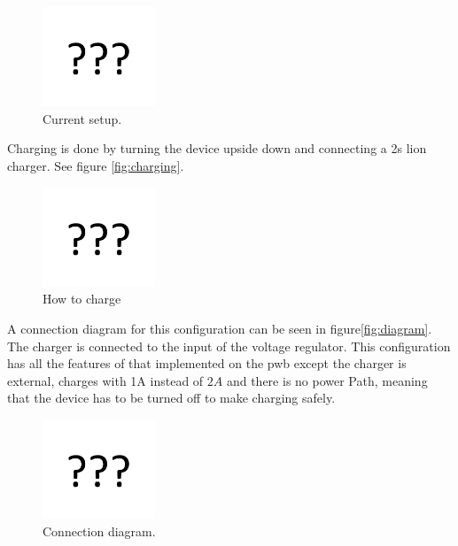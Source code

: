 \begin{figure}[H]
	\centering
	\includegraphics[width=0.3\textwidth]{Figures/missing.png} %
	\caption{Current setup.} %
	\label{fig:modules}
\end{figure}


Charging is done by turning the device upside down and connecting a \gls{2s} \gls{lion} charger. See figure \autoref{fig:charging}.

\begin{figure}[H]
	\centering
	\includegraphics[width=0.3\textwidth]{Figures/missing.png} %
	\caption{How to charge}
	\label{fig:charging}
\end{figure}

A connection diagram for this configuration can be seen in figure\autoref{fig:diagram}. The charger is connected to the input of the voltage regulator. This configuration has all the features of that implemented on the \gls{pwb} except the charger is external, charges with 1A instead of $2A$ and there is no power Path, meaning that the device has to be turned off to make charging safely.

\begin{figure}[H]
	\centering
	\includegraphics[width=0.3\textwidth]{Figures/missing.png} %
	\caption{Connection diagram.}
	\label{fig:diagram}
\end{figure} 

